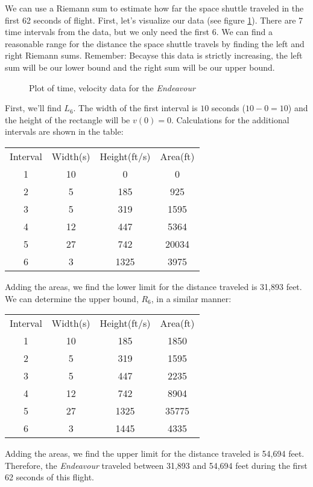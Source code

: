 We can use a Riemann sum to estimate how far the space shuttle traveled in the first 62 seconds of flight. First, let's visualize our data (see figure \ref{fig:endeavourscatter}). There are 7 time intervals from the data, but we only need the first 6. We can find a reasonable range for the distance the space shuttle travels by finding the left and right Riemann sums. Remember: Becayse this data is strictly increasing, the left sum will be our lower bound and the right sum will be our upper bound. 

\begin{figure}
	\centering
	\caption{Plot of time, velocity data for the \textit{Endeavour}}
	\label{fig:endeavourscatter}
\end{figure}

First, we'll find $L_6$. The width of the first interval is $10$ seconds ($10-0=10$) and the height of the rectangle will be $v(0) = 0$. Calculations for the additional intervals are shown in the table:
\begin{center}
\begin{tabular}{c|c|c|c}
	Interval & Width(s) & Height(ft/s) & Area(ft) \\
	1 & 10 & 0 & 0 \\
	2 & 5 & 185 & 925 \\
	3 & 5 & 319 & 1595 \\
	4 & 12 & 447 & 5364 \\
	5 & 27 & 742 & 20034 \\
	6 & 3 & 1325 & 3975 \\
\end{tabular}
\end{center}

Adding the areas, we find the lower limit for the distance traveled is 31,893 feet. We can determine the upper bound, $R_6$, in a similar manner:
\begin{center}
\begin{tabular}{c|c|c|c}
	Interval & Width(s) & Height(ft/s) & Area(ft) \\
	1 & 10 & 185 & 1850 \\
	2 & 5 & 319 & 1595 \\
	3 & 5 & 447 & 2235 \\
	4 & 12 & 742 & 8904 \\
	5 & 27 & 1325 & 35775 \\
	6 & 3 & 1445 & 4335 \\
\end{tabular}
\end{center}
Adding the areas, we find the upper limit for the distance traveled is 54,694 feet. Therefore, the \textit{Endeavour} traveled between 31,893 and 54,694 feet during the first 62 seconds of this flight. 

